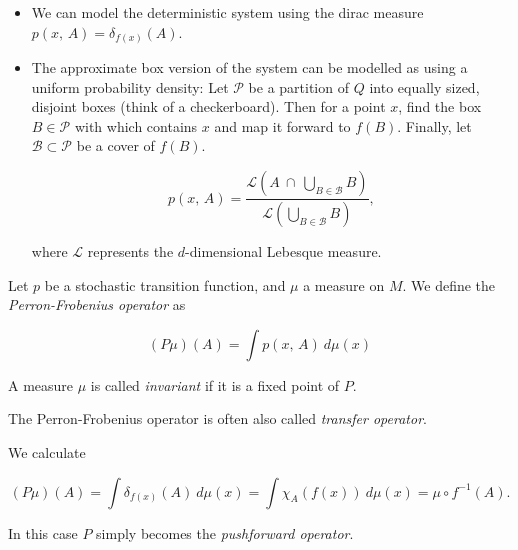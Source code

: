 \begin{example}

    \begin{itemize}
        \item \cite*{attr} We can model the deterministic system using the dirac measure \\
        $p(x,\, A) = \delta_{f(x)}(A)$. 
        \item The approximate box version of the system can be modelled as using a uniform 
        probability density: Let $\mathcal{P}$ be a partition of $Q$ into equally sized,
        disjoint boxes (think of a checkerboard). Then for a point $x$, find the box 
        $B \in \mathcal{P}$ with which contains $x$ and map it forward to $f(B)$. Finally, let 
        $\mathcal{B} \subset \mathcal{P}$ be a cover of $f(B)$.

        \begin{equation}
            p(x,\, A) = \frac{
                \mathcal{L} \left( A\ \cap\ \bigcup_{B \in \mathcal{B}} B \right)
            }{
                \mathcal{L} \left(\bigcup_{B \in \mathcal{B}} B \right)
            },
        \end{equation}

        where $\mathcal{L}$ represents the $d$-dimensional Lebesque measure.
    
    \end{itemize}

\end{example}

\begin{definition}
    \cite*{attr} Let $p$ be a stochastic transition function, and $\mu$ a measure on $M$. 
    We define the \emph{Perron-Frobenius operator} as
    
    \begin{equation}
        (P\mu)(A) = \int p(x,\, A)\ d\mu (x)
    \end{equation}
    
    A measure $\mu$ is called \emph{invariant} if it is a fixed point of $P$.
\end{definition}

\begin{remark}
    The Perron-Frobenius operator is often also called \emph{transfer operator}.
\end{remark}

\begin{example} 
    \cite*{attr} We calculate

    \begin{equation}
        (P\mu)(A) = \int \delta_{f(x)} (A)\ d\mu (x) 
        = \int \chi_A (f(x))\ d\mu (x) = \mu \circ f^{-1}(A).
    \end{equation}

    In this case $P$ simply becomes the \emph{pushforward operator}.
\end{example}

